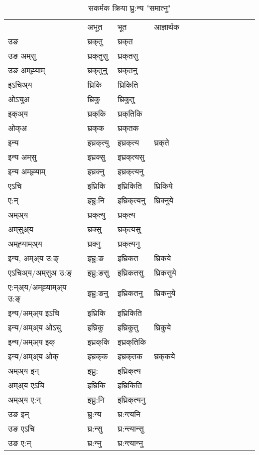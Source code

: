 \begin{table}[H]
\centering
\caption{\label{ikt.vt} सकर्मक क्रिया  घ्रु:न्य  "समात्‍नु"  }
\begin{tabular}{l|l|l|l|l|l|l|l|l|l|l|l|l}  \toprule
&अभूत & भूत & आज्ञार्थक \\ 
उङ &घ्रक्‌तु &घ्रक्‌त \\ 
उङ अम्‌सु&घ्रक्‌तुसु &घ्रक्‌तसु \\ 
उङ अम्‌ह्‍याम्&घ्रक्‌तुनु &घ्रक्‌तनु \\ 
इऽचिअ्य &घ्रिकि &घ्रिकिति   \\ 
ओऽचुअ        &घ्रिकु &घ्रिकुतु   \\ 
इक्अ्य&घ्रक्‌कि &घ्रक्‌तिकि   \\ 
ओक्अ &घ्रक्‌क &घ्रक्‌तक   \\ 
इन्य & इघ्रक्‌त्यु  & इघ्रक्‌त्य &घ्रक्‌ते  \\ 
इन्य अम्‌सु& इघ्रक्सु  & इघ्रक्‌त्यसु   \\ 
इन्य अम्‌ह्‍याम्& इघ्रक्‍नु  & इघ्रक्‌त्यनु   \\ 
एऽचि & इघ्रिकि & इघ्रिकिति &घ्रिकिये    \\ 
ए:न् & इघ्रु:नि  & इघ्रिक्‌त्यनु &घ्रिक्‍नुये  \\ 
अम्अ्य & घ्रक्‌त्यु  & घ्रक्‌त्य  \\ 
अम्‌सुअ्य & घ्रक्सु & घ्रक्‌त्यसु  \\ 
अम्‌ह्‍याम्अ्य & घ्रक्‍नु  & घ्रक्‌त्यनु \\ 
\midrule
इन्य, अम्अ्य उ:ङ्‌ &इघ्रु:ङ &इघ्रिकत &घ्रिकये \\ 
एऽचिअ्य/अम्‌सुअ उ:ङ्‌ &इघ्रु:ङसु &इघ्रिकतसु &घ्रिकसुये \\ 
ए:न्अ्य/अम्‌ह्‍याम्अ्य उ:ङ्‌ &इघ्रु:ङनु &इघ्रिकतनु &घ्रिकनुये \\ 
इन्य/अम्अ्य इऽचि &इघ्रिकि &इघ्रिकिति    \\ 
इन्य/अम्अ्य ओऽचु &इघ्रिकु &इघ्रिकुतु  &घ्रिकुये  \\ 
इन्य/अम्अ्य इक् &इघ्रक्‌कि &इघ्रक्‌तिकि   \\ 
इन्य/अम्अ्य ओक् &इघ्रक्‌क &इघ्रक्‌तक  &घ्रक्‌कये  \\ 
अम्अ्य इन् & इघ्रु: & इघ्रिक्‌त्य   \\ 
अम्अ्य एऽचि & इघ्रिकि & इघ्रिकिति    \\ 
अम्अ्य ए:न् & इघ्रु:नि  & इघ्रिक्‌त्यनु  \\ 
\midrule
उङ इन् & घ्रु:न्य  & घ्र:न्त्यनि  \\ 
उङ एऽचि & घ्र:न्सु  & घ्र:न्त्यान्सु   \\ 
उङ ए:न्& घ्र:न्‍नु  & घ्र:न्त्यान्‍नु   \\ 
\bottomrule
\end{tabular}
\end{table}


